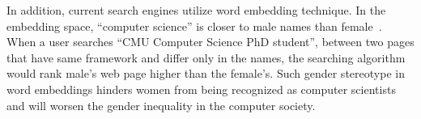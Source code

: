 In addition, current search engines utilize word embedding technique. In the embedding space, ``computer science'' is closer to male names than female~\cite{kaiwei}. When a user searches ``CMU Computer Science PhD student'', between two pages that have same framework and differ only in the names, the searching algorithm would rank male's web page higher than the female's. 
Such gender stereotype in word embeddings hinders women from being recognized as computer scientists and will worsen the gender inequality in the computer society.
\fi






